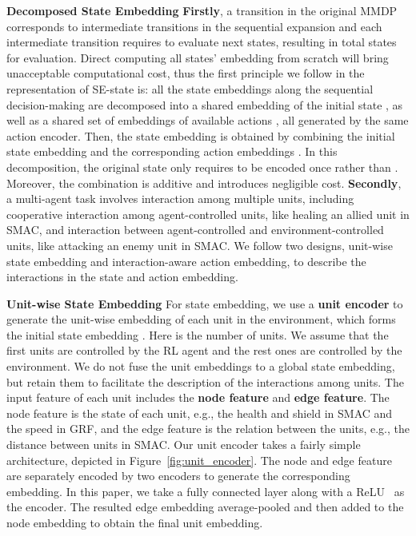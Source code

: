 \documentclass[letterpaper]{article} \usepackage{aaai23}  \usepackage{times}  \usepackage{helvet}  \usepackage{courier}  \usepackage[hyphens]{url}  \usepackage{graphicx} \urlstyle{rm} \def\UrlFont{\rm}  \usepackage{natbib}  \usepackage{caption} \frenchspacing  \setlength{\pdfpagewidth}{8.5in} \setlength{\pdfpageheight}{11in} \usepackage{algorithm}
\begin{document}
\textbf{Decomposed State Embedding} \textbf{Firstly}, a transition  in the original MMDP  corresponds to  intermediate transitions in the sequential expansion  and each intermediate transition requires to evaluate  next states, resulting in  total states for evaluation. Direct computing all states' embedding from scratch will bring unacceptable computational cost, thus the first principle we follow in the representation of SE-state is: all the state embeddings  along the sequential decision-making are decomposed into a shared embedding  of the initial state , as well as a shared set of embeddings  of available actions , all generated by the same action encoder. Then, the state embedding  is obtained by combining the initial state embedding  and the corresponding action embeddings . In this decomposition, the original state only requires to be encoded once rather than . Moreover, the combination is additive and introduces negligible cost. \textbf{Secondly}, a multi-agent task involves interaction among multiple units, including cooperative interaction among agent-controlled units, like healing an allied unit in SMAC, and interaction between agent-controlled and environment-controlled units, like attacking an enemy unit in SMAC. We follow two designs, unit-wise state embedding and interaction-aware action embedding, to describe the interactions in the state and action embedding.

\textbf{Unit-wise State Embedding} For state embedding, we use a \textbf{unit encoder} to generate the unit-wise embedding  of each unit  in the environment, which forms the initial state embedding . Here  is the number of units. We assume that the first  units are controlled by the RL agent and the rest  ones are controlled by the environment. We do not fuse the unit embeddings to a global state embedding, but retain them to facilitate the description of the interactions among units. The input feature of each unit includes the \textbf{node feature} and \textbf{edge feature}. The node feature is the state of each unit, e.g., the health and shield in SMAC and the speed in GRF, and the edge feature is the relation between the units, e.g., the distance between units in SMAC. Our unit encoder takes a fairly simple architecture, depicted in Figure~\ref{fig:unit_encoder}. The node and edge feature are separately encoded by two encoders to generate the corresponding embedding. In this paper, we take a fully connected layer along with a ReLU~\citeyear{relu} as the encoder. The resulted edge embedding average-pooled and then added to the node embedding to obtain the final unit embedding. 
\end{document}
